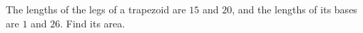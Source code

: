The lengths of the legs of a trapezoid are $15$ and $20$, and the lengths of its bases are $1$ and $26$. Find its area.
